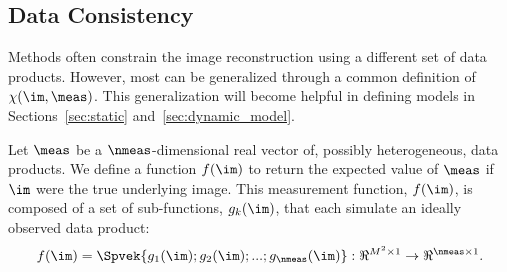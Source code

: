 


\subsection{Data Consistency}
\label{sec:dataproducts}

Methods often constrain the image reconstruction using a different set of data products. However, most can be generalized through a common definition of $\chi(\im, \meas)$. This generalization will become helpful in defining models in Sections~\ref{sec:static} and~\ref{sec:dynamic_model}.



Let $\meas$ be a $\nmeas$-dimensional real vector of, possibly heterogeneous, data products. 
We define a function $f(\im)$ to return the expected value of $\meas$ if $\im$ were the true underlying image. This measurement function, $f(\im)$, is composed of a set of sub-functions, $g_k(\im)$, that each simulate an ideally observed data product: 
\begin{align}
f(\im) = \Spvek{g_1(\im); g_2(\im); ...; g_{\nmeas}(\im)} : \Re^{ M^2 \times 1} \rightarrow \Re^{ \nmeas \times 1 }.
\end{align}

